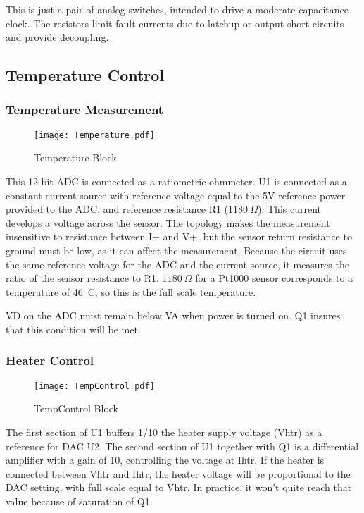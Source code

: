 This is just a pair of analog switches, intended to drive a moderate capacitance clock. The resistors limit fault currents due to latchup or output short circuits and provide decoupling.

\subsection{Temperature Control}

\subsubsection{Temperature Measurement}
   \begin{figure}
   \begin{center}
   \texttt{[image: Temperature.pdf]}
   \end{center}
   \caption{Temperature Block}
   \end{figure}
   
This 12 bit ADC is connected as a ratiometric ohmmeter. U1 is connected as a constant current source with reference voltage equal to the 5V reference power provided to the ADC, and reference resistance R1 ($1180\ \Omega$). This current develops a voltage across the sensor. The topology makes the measurement insensitive to resistance between I+ and V+, but the sensor return resistance to ground must be low, as it can affect the measurement. Because the circuit uses the same reference voltage for the ADC and the current source, it measures the ratio of the sensor resistance to R1. $1180\ \Omega$ for a Pt1000 sensor corresponds to a temperature of 46\ C, so this is the full scale temperature.

VD on the ADC must remain below VA when power is turned on. Q1 insures that this condition will be met.

\subsubsection{Heater Control}
   \begin{figure}
   \begin{center}
   \texttt{[image: TempControl.pdf]}
   \end{center}
   \caption{TempControl Block}
   \end{figure}

The first section of U1 buffers 1/10 the heater supply voltage (Vhtr) as a reference for DAC U2. The second section of U1 together with Q1 is a differential amplifier with a gain of 10, controlling the voltage at Ihtr.  If the heater is connected between Vhtr and Ihtr, the heater voltage will be proportional to the DAC setting, with full scale equal to Vhtr. In practice, it won't quite reach that value because of saturation of Q1.

